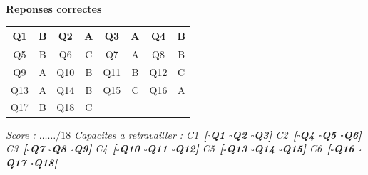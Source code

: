 
\bigskip

\begin{center}
\textbf{Reponses correctes}

\medskip
\begin{tabular}{|c|c||c|c||c|c||c|c|}
\hline
Q1 & B & Q2 & A & Q3 & A & Q4 & B \\
\hline
Q5 & B & Q6 & C & Q7 & A & Q8 & B \\
\hline
Q9 & A & Q10 & B & Q11 & B & Q12 & C \\
\hline
Q13 & A & Q14 & B & Q15 & C & Q16 & A \\
\hline
Q17 & B & Q18 & C & & & & \\
\hline
\end{tabular}
\end{center}

\bigskip

\begin{center}
\textit{%
  Score : $\ldots\ldots / 18$ \quad
  Capacites a retravailler : C1~\textbf{[$\square$Q1 $\square$Q2 $\square$Q3]}
  C2~\textbf{[$\square$Q4 $\square$Q5 $\square$Q6]}
  C3~\textbf{[$\square$Q7 $\square$Q8 $\square$Q9]}
  C4~\textbf{[$\square$Q10 $\square$Q11 $\square$Q12]}
  C5~\textbf{[$\square$Q13 $\square$Q14 $\square$Q15]}
  C6~\textbf{[$\square$Q16 $\square$Q17 $\square$Q18]}
}
\end{center}
